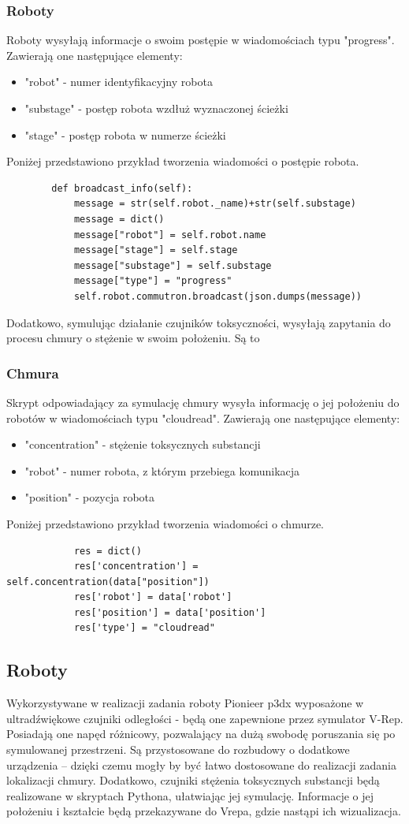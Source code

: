 \documentclass[a4paper, 12pt]{article}
\begin{document}
	\subsubsection{Roboty}
	Roboty wysyłają informacje o swoim postępie w wiadomościach typu "progress". Zawierają one następujące elementy:
	\begin{itemize}
	\item "robot" - numer identyfikacyjny robota
	\item "substage" - postęp robota wzdłuż wyznaczonej ścieżki
	\item "stage" - postęp robota w numerze ścieżki
	\end{itemize}
	Poniżej przedstawiono przykład tworzenia wiadomości o postępie robota.
	\begin{verbatim}
	    def broadcast_info(self):
	        message = str(self.robot._name)+str(self.substage)
	        message = dict()
	        message["robot"] = self.robot.name
	        message["stage"] = self.stage
	        message["substage"] = self.substage
	        message["type"] = "progress"
	        self.robot.commutron.broadcast(json.dumps(message))
	\end{verbatim}
	Dodatkowo, symulując działanie czujników toksyczności, wysyłają zapytania do procesu chmury o stężenie w swoim położeniu. Są to
	\subsubsection{Chmura}
	Skrypt odpowiadający za symulację chmury wysyła informację o jej położeniu do robotów w wiadomościach typu "cloudread".
	Zawierają one następujące elementy:
	\begin{itemize}
	\item "concentration" - stężenie toksycznych substancji
	\item "robot" - numer robota, z którym przebiega komunikacja
	\item "position" - pozycja robota
	\end{itemize}
	Poniżej przedstawiono przykład tworzenia wiadomości o chmurze.
	\begin{verbatim}
	        res = dict()
	        res['concentration'] = self.concentration(data["position"])
	        res['robot'] = data['robot']
	        res['position'] = data['position']
	        res['type'] = "cloudread"
	\end{verbatim}
	
	
	\subsection{Roboty}
	Wykorzystywane w realizacji zadania roboty Pionieer p3dx wyposażone w ultradźwiękowe czujniki odległości - będą one zapewnione przez symulator V-Rep. Posiadają one napęd różnicowy, pozwalający na dużą swobodę poruszania się po symulowanej przestrzeni. Są przystosowane do rozbudowy o dodatkowe urządzenia -- dzięki czemu mogły by być łatwo dostosowane do realizacji zadania lokalizacji chmury.
	Dodatkowo, czujniki stężenia toksycznych substancji będą realizowane w skryptach Pythona, ułatwiając jej symulację. Informacje o jej położeniu i kształcie będą przekazywane do Vrepa, gdzie nastąpi ich wizualizacja.
\end{document}
